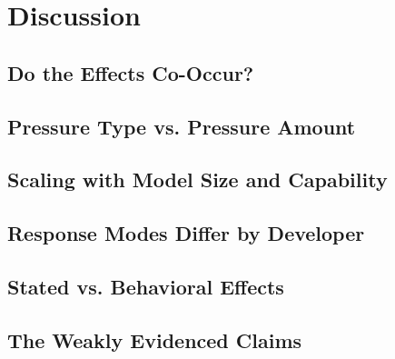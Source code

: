 \section{Discussion}
\label{sec:discussion}

\subsection{Do the Effects Co-Occur?}

\subsection{Pressure Type vs. Pressure Amount}

\subsection{Scaling with Model Size and Capability}

\subsection{Response Modes Differ by Developer}

\subsection{Stated vs. Behavioral Effects}

\subsection{The Weakly Evidenced Claims}



